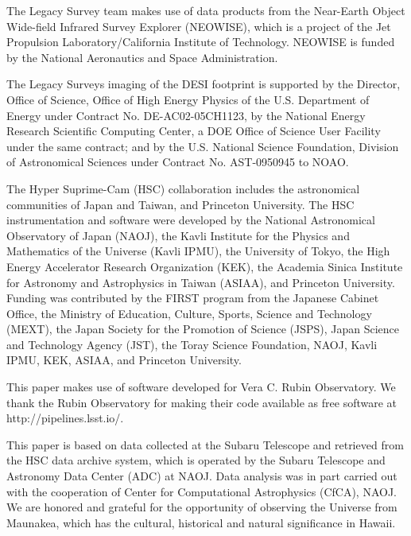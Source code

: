 \documentclass[twocolumn]{aastex62}
\begin{document}
The Legacy Survey team makes use of data products from the Near-Earth Object Wide-field Infrared Survey Explorer (NEOWISE), which is a project of the Jet Propulsion Laboratory/California Institute of Technology. NEOWISE is funded by the National Aeronautics and Space Administration.

The Legacy Surveys imaging of the DESI footprint is supported by the Director, Office of Science, Office of High Energy Physics of the U.S. Department of Energy under Contract No. DE-AC02-05CH1123, by the National Energy Research Scientific Computing Center, a DOE Office of Science User Facility under the same contract; and by the U.S. National Science Foundation, Division of Astronomical Sciences under Contract No. AST-0950945 to NOAO.


The Hyper Suprime-Cam (HSC) collaboration includes the astronomical communities of Japan and Taiwan, and Princeton University. The HSC instrumentation and software were developed by the National Astronomical Observatory of Japan (NAOJ), the Kavli Institute for the Physics and Mathematics of the Universe (Kavli IPMU), the University of Tokyo, the High Energy Accelerator Research Organization (KEK), the Academia Sinica Institute for Astronomy and Astrophysics in Taiwan (ASIAA), and Princeton University. Funding was contributed by the FIRST program from the Japanese Cabinet Office, the Ministry of Education, Culture, Sports, Science and Technology (MEXT), the Japan Society for the Promotion of Science (JSPS), Japan Science and Technology Agency (JST), the Toray Science Foundation, NAOJ, Kavli IPMU, KEK, ASIAA, and Princeton University. 

This paper makes use of software developed for Vera C. Rubin Observatory. We thank the Rubin Observatory for making their code available as free software at http://pipelines.lsst.io/.

This paper is based on data collected at the Subaru Telescope and retrieved from the HSC data archive system, which is operated by the Subaru Telescope and Astronomy Data Center (ADC) at NAOJ. Data analysis was in part carried out with the cooperation of Center for Computational Astrophysics (CfCA), NAOJ. We are honored and grateful for the opportunity of observing the Universe from Maunakea, which has the cultural, historical and natural significance in Hawaii. 



\end{document}
